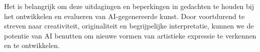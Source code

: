 Het is belangrijk om deze uitdagingen en beperkingen in gedachten te houden bij het ontwikkelen en evalueren van AI-gegenereerde kunst. Door voortdurend te streven naar creativiteit, originaliteit en begrijpelijke interpretatie, kunnen we de potentie van AI benutten om nieuwe vormen van artistieke expressie te verkennen en te ontwikkelen.
